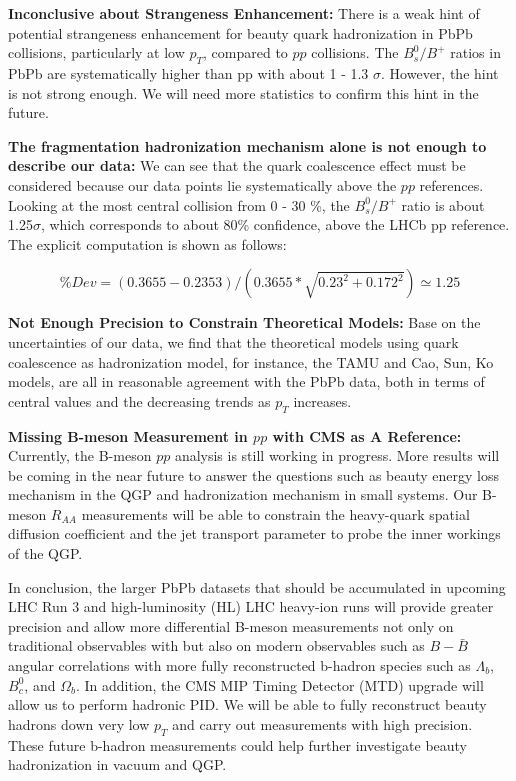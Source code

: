 \textbf{Inconclusive about Strangeness Enhancement:} There is a weak hint of potential strangeness enhancement for beauty quark hadronization in PbPb collisions, particularly at low $p_T$, compared to $pp$ collisions. The $B^0_s/B^+$ ratios in PbPb are systematically higher than pp with about 1 - 1.3 $\sigma$. However, the hint is not strong enough. We will need more statistics to confirm this hint in the future.

\textbf{The fragmentation hadronization mechanism alone is not enough to describe our data:} We can see that the quark coalescence effect must be considered because our data points lie systematically above the $pp$ references. Looking at the most central collision from 0 - 30 \%, the $B^0_s/B^+$ ratio is about 1.25$\sigma$, which corresponds to about 80\% confidence, above the LHCb pp reference. The explicit computation is shown as follows:

\begin{equation}
\% Dev = (0.3655 - 0.2353)/(0.3655 * \sqrt{0.23^2 + 0.172^2}) \simeq 1.25 
\end{equation}


\textbf{Not Enough Precision to Constrain Theoretical Models:} Base on the uncertainties of our data, we find that the theoretical models using quark coalescence as hadronization model, for instance, the TAMU and Cao, Sun, Ko models, are all in reasonable agreement with the PbPb data, both in terms of central values and the decreasing trends as $p_T$ increases.

\textbf{Missing B-meson Measurement in $pp$ with CMS as A Reference:} Currently, the B-meson $pp$ analysis is still working in progress. More results will be coming in the near future to answer the questions such as beauty energy loss mechanism in the QGP and hadronization mechanism in small systems. Our B-meson $R_{AA}$ measurements will be able to constrain the heavy-quark spatial diffusion coefficient and the jet transport parameter to probe the inner workings of the QGP.

In conclusion, the larger PbPb datasets that should be accumulated in upcoming LHC Run 3 and high-luminosity (HL) LHC heavy-ion runs will provide greater precision and allow more differential B-meson measurements not only on traditional observables with but also on modern observables such as $B-\bar B$ angular correlations with more fully reconstructed b-hadron species such as $\Lambda_b$, $B^0_c$, and $\Omega_b$. In addition, the CMS MIP Timing Detector (MTD) upgrade \cite{CMSMTD} will allow us to perform hadronic PID. We will be able to fully reconstruct beauty hadrons down very low $p_T$ and carry out measurements with high precision. These future b-hadron measurements could help further investigate beauty hadronization in vacuum and QGP.


